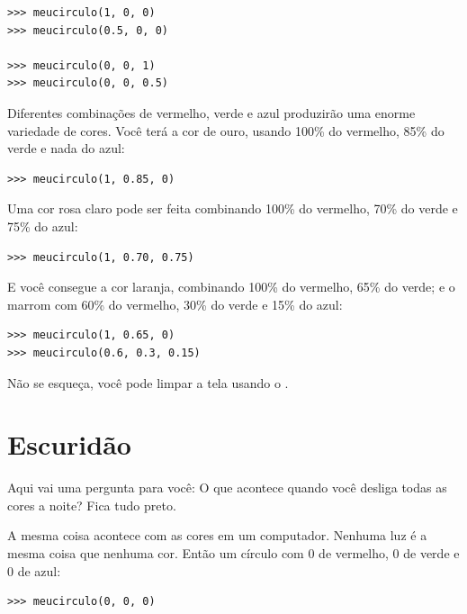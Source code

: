 {\begin{listing}
\begin{verbatim}
>>> meucirculo(1, 0, 0)
>>> meucirculo(0.5, 0, 0)

>>> meucirculo(0, 0, 1)
>>> meucirculo(0, 0, 0.5)
\end{verbatim}
\end{listing}

\noindent
Diferentes combinações de vermelho, verde e azul produzirão uma enorme variedade de cores. Você terá a cor de ouro, usando 100\% do vermelho, 85\% do verde e nada do azul:

\begin{listing}
\begin{verbatim}
>>> meucirculo(1, 0.85, 0)
\end{verbatim}
\end{listing}

\noindent
Uma cor rosa claro pode ser feita combinando 100\% do vermelho, 70\% do verde e 75\% do azul:

\begin{listing}
\begin{verbatim}
>>> meucirculo(1, 0.70, 0.75)
\end{verbatim}
\end{listing}

\noindent
E você consegue a cor laranja, combinando 100\% do vermelho, 65\% do verde; e o marrom com 60\% do vermelho, 30\% do verde e 15\% do azul:

\begin{listing}
\begin{verbatim}
>>> meucirculo(1, 0.65, 0)
>>> meucirculo(0.6, 0.3, 0.15)
\end{verbatim}
\end{listing}

\noindent
Não se esqueça, você pode limpar a tela usando o .

\section{Escuridão}

Aqui vai uma pergunta para você: O que acontece quando você desliga todas as cores a noite? Fica tudo preto.
\par
A mesma coisa acontece com as cores em um computador. Nenhuma luz é a mesma coisa que nenhuma cor. Então um círculo com 0 de vermelho, 0 de verde e 0 de azul:

\begin{listing}
\begin{verbatim}
>>> meucirculo(0, 0, 0)
\end{verbatim}
\end{listing}

}
